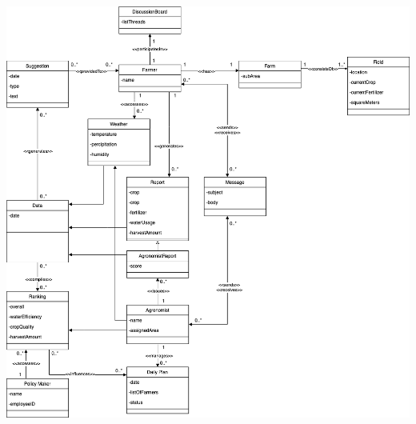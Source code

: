 \begin{center}
\includegraphics[scale=0.4]{../images_diagrams/class_diagram.drawio.png}
\end{center}

